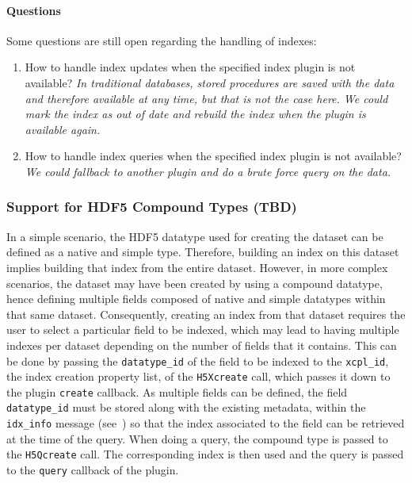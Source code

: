 \paragraph{Questions}Some questions are still open regarding the handling of indexes:
\begin{enumerate}
\item How to handle index updates when the specified index plugin is not available?
\textit{In traditional databases, stored procedures are saved with the data and
therefore available at any time, but that is not the case here.
We could mark the index as out of date and rebuild the index when the plugin is
available again.}
\item How to handle index queries when the specified index plugin is not
available? \textit{We could fallback to another plugin and do a brute force query on the data.}
\end{enumerate}

\subsubsection{Support for HDF5 Compound Types (TBD)}

In a simple scenario, the HDF5 datatype used for creating the dataset can be defined
as a native and simple type. Therefore, building an index on this dataset implies
building that index from the entire dataset. However, in more complex scenarios, the
dataset may have been created by using a compound datatype, hence defining
multiple fields composed of native and simple datatypes within that same dataset.
Consequently, creating an index from that dataset requires the user to select a
particular field to be indexed, which may lead to having multiple indexes per dataset
depending on the number of fields that it contains. This can be done by passing
the \texttt{datatype\_id} of the field to be indexed to the \texttt{xcpl\_id},
the index creation property list, of the \texttt{H5Xcreate} call, which passes
it down to the plugin \texttt{create} callback. As multiple fields can be defined,
the field \texttt{datatype\_id} must be stored along with the existing metadata, within the
\texttt{idx\_info} message (see~) so that the index
associated to the field can be retrieved at the time of the query.
When doing a query, the compound type is passed to the \texttt{H5Qcreate} call.
The corresponding index is then used and the query is passed to the \texttt{query}
callback of the plugin.

